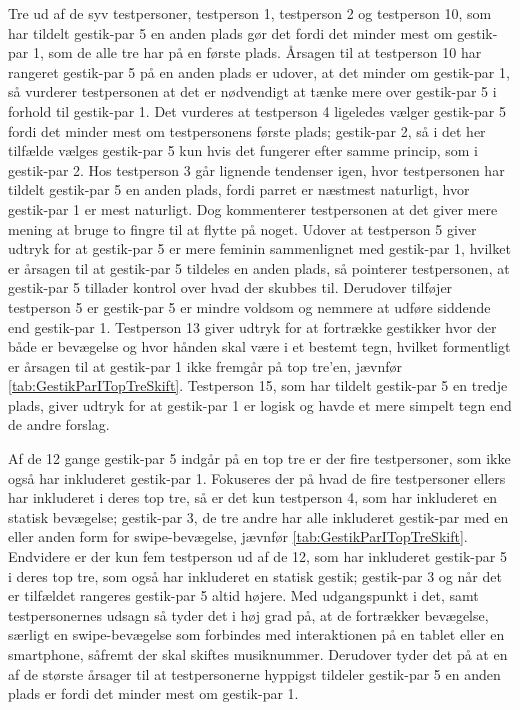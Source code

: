 Tre ud af de syv testpersoner, testperson 1, testperson 2 og testperson 10, som har tildelt gestik-par 5 en anden plads gør det fordi det minder mest om gestik-par 1, som de alle tre har på en første plads. Årsagen til at testperson 10 har rangeret gestik-par 5 på en anden plads er udover, at det minder om gestik-par 1, så vurderer testpersonen at det er nødvendigt at tænke mere over gestik-par 5 i forhold til gestik-par 1. Det vurderes at testperson 4 ligeledes vælger gestik-par 5 fordi det minder mest om testpersonens første plads; gestik-par 2, så i det her tilfælde vælges gestik-par 5 kun hvis det fungerer efter samme princip, som i gestik-par 2. Hos testperson 3 går lignende tendenser igen, hvor testpersonen har tildelt gestik-par 5 en anden plads, fordi parret er næstmest naturligt, hvor gestik-par 1 er mest naturligt. Dog kommenterer testpersonen at det giver mere mening at bruge to fingre til at flytte på noget. Udover at testperson 5 giver udtryk for at gestik-par 5 er mere feminin sammenlignet med gestik-par 1, hvilket er årsagen til at gestik-par 5 tildeles en anden plads, så pointerer testpersonen, at gestik-par 5 tillader kontrol over hvad der skubbes til. Derudover tilføjer testperson 5 er gestik-par 5 er mindre voldsom og nemmere at udføre siddende end gestik-par 1. Testperson 13 giver udtryk for at fortrække gestikker hvor der både er bevægelse og hvor hånden skal være i et bestemt tegn, hvilket formentligt er årsagen til at gestik-par 1 ikke fremgår på top tre'en, jævnfør \autoref{tab:GestikParITopTreSkift}. Testperson 15, som har tildelt gestik-par 5 en tredje plads, giver udtryk for at gestik-par 1 er logisk og havde et mere simpelt tegn end de andre forslag. 

Af de 12 gange gestik-par 5 indgår på en top tre er der fire testpersoner, som ikke også har inkluderet gestik-par 1. Fokuseres der på hvad de fire testpersoner ellers har inkluderet i deres top tre, så er det kun testperson 4, som har inkluderet en statisk bevægelse; gestik-par 3, de tre andre har alle inkluderet gestik-par med en eller anden form for swipe-bevægelse, jævnfør \autoref{tab:GestikParITopTreSkift}. Endvidere er der kun fem testperson ud af de 12, som har inkluderet gestik-par 5 i deres top tre, som også har inkluderet en statisk gestik; gestik-par 3 og når det er tilfældet rangeres gestik-par 5 altid højere. Med udgangspunkt i det, samt testpersonernes udsagn så tyder det i høj grad på, at de fortrækker bevægelse, særligt en swipe-bevægelse som forbindes med interaktionen på en tablet eller en smartphone, såfremt der skal skiftes musiknummer. Derudover tyder det på at en af de største årsager til at testpersonerne hyppigst tildeler gestik-par 5 en anden plads er fordi det minder mest om gestik-par 1.

